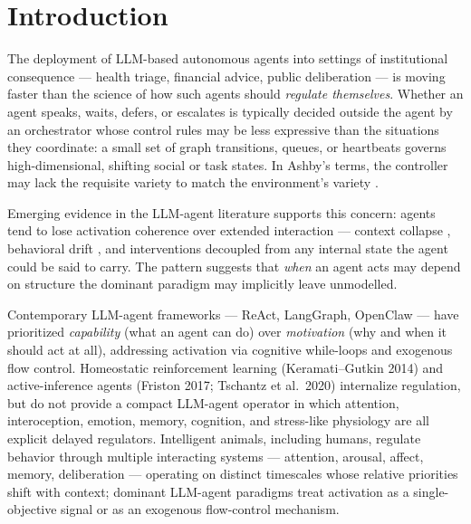 \documentclass{article}
\begin{document}
\section{Introduction}

The deployment of LLM-based autonomous agents into settings of institutional consequence --- health triage, financial advice, public deliberation --- is moving faster than the science of how such agents should \textit{regulate themselves}. Whether an agent speaks, waits, defers, or escalates is typically decided outside the agent by an orchestrator whose control rules may be less expressive than the situations they coordinate: a small set of graph transitions, queues, or heartbeats governs high-dimensional, shifting social or task states. In Ashby's terms, the controller may lack the requisite variety to match the environment's variety \citep{ashby1956introduction}.

Emerging evidence in the LLM-agent literature supports this concern: agents tend to lose activation coherence over extended interaction --- context collapse \citep{liu2024lost}, behavioral drift \citep{rath2026agentdrift}, and interventions decoupled from any internal state the agent could be said to carry. The pattern suggests that \textit{when} an agent acts may depend on structure the dominant paradigm may implicitly leave unmodelled.

Contemporary LLM-agent frameworks --- ReAct, LangGraph, OpenClaw --- have prioritized \textit{capability} (what an agent can do) over \textit{motivation} (why and when it should act at all), addressing activation via cognitive while-loops and exogenous flow control. Homeostatic reinforcement learning (Keramati--Gutkin 2014) and active-inference agents (Friston 2017; Tschantz et al.\ 2020) internalize regulation, but do not provide a compact LLM-agent operator in which attention, interoception, emotion, memory, cognition, and stress-like physiology are all explicit delayed regulators. Intelligent animals, including humans, regulate behavior through multiple interacting systems --- attention, arousal, affect, memory, deliberation --- operating on distinct timescales whose relative priorities shift with context; dominant LLM-agent paradigms treat activation as a single-objective signal or as an exogenous flow-control mechanism.
\end{document}
